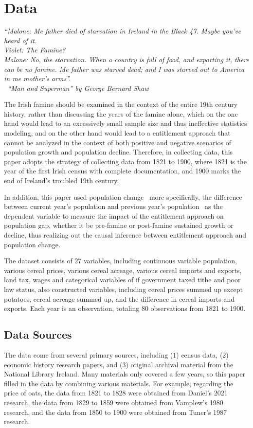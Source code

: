 \chapter{Data}

\textit{``Malone: Me father died of starvation in Ireland in the Black 47. Maybe you've heard of it.\\
Violet: The Famine?\\
Malone: No, the starvation. When a country is full of food, and exporting it, there can be no famine. Me father was starved dead; and I was starved out to America in me mother's arms''.\\
\textemdash\ ``Man and Superman'' by George Bernard Shaw
} \citep{shaw1947man}
\vspace{.2cm}

The Irish famine should be examined in the context of the entire 19th century history, rather than discussing the years of the famine alone, which on the one hand would lead to an excessively small sample size and thus ineffective statistics modeling, and on the other hand would lead to a entitlement approach that cannot be analyzed in the context of both positive and negative scenarios of population growth and population decline. Therefore, in collecting data, this paper adopts the strategy of collecting data from 1821 to 1900, where 1821 is the year of the first Irish census with complete documentation, and 1900 marks the end of Ireland's troubled 19th century.

In addition, this paper used population change \textendash\ more specifically, the difference between current year's population and previous year's population \textendash\ as the dependent variable to measure the impact of the entitlement approach on population gap, whether it be pre-famine or post-famine sustained growth or decline, thus  realizing out the causal inference between entitlement approach and population change.

The dataset consists of 27 variables, including continuous variable population, various cereal prices, various cereal acreage, various cereal imports and exports, land tax, wages and categorical variables of if government taxed tithe and poor law status, also constructed variables, including cereal prices summed up except potatoes, cereal acreage summed up, and the difference in cereal imports and exports. Each year is an observation, totaling 80 observations from 1821 to 1900.

\section{Data Sources}
\vspace{0pt}
The data come from several primary sources, including (1) census data, (2) economic history research papers, and (3) original archival material from the National Library Ireland. Many materials only covered a few years, so this paper filled in the data by combining various materials. For example, regarding the price of oats, the data from 1821 to 1828 were obtained from Daniel's 2021 research, the data from 1829 to 1859 were obtained from Vamplew's 1980 research, and the data from 1850 to 1900 were obtained from Tuner's 1987 research. 

